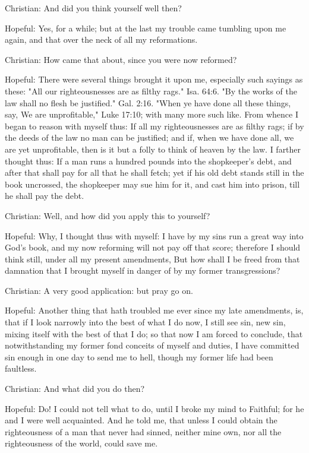 Christian: And did you think yourself well then?

Hopeful: Yes, for a while; but at the last my trouble came tumbling
upon me again, and that over the neck of all my reformations.

Christian: How came that about, since you were now reformed?

Hopeful: There were several things brought it upon me, especially such
sayings as these: "All our righteousnesses are as filthy rags." Isa.
64:6. "By the works of the law shall no flesh be justified." Gal. 2:16.
"When ye have done all these things, say, We are unprofitable," Luke
17:10; with many more such like. From whence I began to reason with
myself thus: If all my righteousnesses are as filthy rags; if by the
deeds of the law no man can be justified; and if, when we have done
all, we are yet unprofitable, then is it but a folly to think of heaven
by the law. I farther thought thus: If a man runs a hundred pounds into
the shopkeeper's debt, and after that shall pay for all that he shall
fetch; yet if his old debt stands still in the book uncrossed, the
shopkeeper may sue him for it, and cast him into prison, till he shall
pay the debt.

Christian: Well, and how did you apply this to yourself?

Hopeful: Why, I thought thus with myself: I have by my sins run a great
way into God's book, and my now reforming will not pay off that score;
therefore I should think still, under all my present amendments, But
how shall I be freed from that damnation that I brought myself in
danger of by my former transgressions?

Christian: A very good application: but pray go on.

Hopeful: Another thing that hath troubled me ever since my late
amendments, is, that if I look narrowly into the best of what I do now,
I still see sin, new sin, mixing itself with the best of that I do; so
that now I am forced to conclude, that notwithstanding my former fond
conceits of myself and duties, I have committed sin enough in one day
to send me to hell, though my former life had been faultless.

Christian: And what did you do then?

Hopeful: Do! I could not tell what to do, until I broke my mind to
Faithful; for he and I were well acquainted. And he told me, that
unless I could obtain the righteousness of a man that never had sinned,
neither mine own, nor all the righteousness of the world, could save
me.

